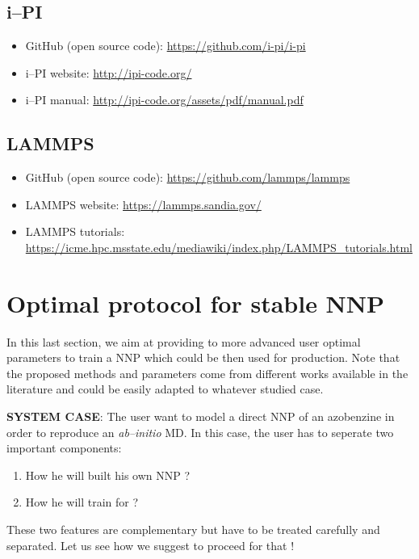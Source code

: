 \documentclass[12pt]{article}
\begin{document}
\subsection{i--PI}
\begin{itemize}
    \item GitHub (open source code): \url{https://github.com/i-pi/i-pi}
    \item i--PI website: \url{http://ipi-code.org/}
    \item i--PI manual: \url{http://ipi-code.org/assets/pdf/manual.pdf}
\end{itemize}
\subsection{LAMMPS}
\begin{itemize}
    \item GitHub (open source code): \url{https://github.com/lammps/lammps}
    \item LAMMPS website: \url{https://lammps.sandia.gov/}
    \item LAMMPS tutorials: \url{https://icme.hpc.msstate.edu/mediawiki/index.php/LAMMPS_tutorials.html}
\end{itemize}

\newpage
{}
\section{Optimal protocol for stable NNP}
In this last section, we aim at providing to more advanced user optimal parameters to train a NNP which could be then used for production. Note that the proposed methods and parameters come from different works available in the literature and could be easily adapted to whatever studied case. 


\textbf{SYSTEM CASE}: The user want to model a direct NNP of an azobenzine in order to reproduce an \textit{ab--initio} MD. In this case, the user has to seperate two important components:
\begin{enumerate}
    \item How he will built his own NNP ?
    \item How he will train for ?
\end{enumerate}
These two features are complementary but have to be treated carefully and separated. Let us see how we suggest to proceed for that !
\end{document}
